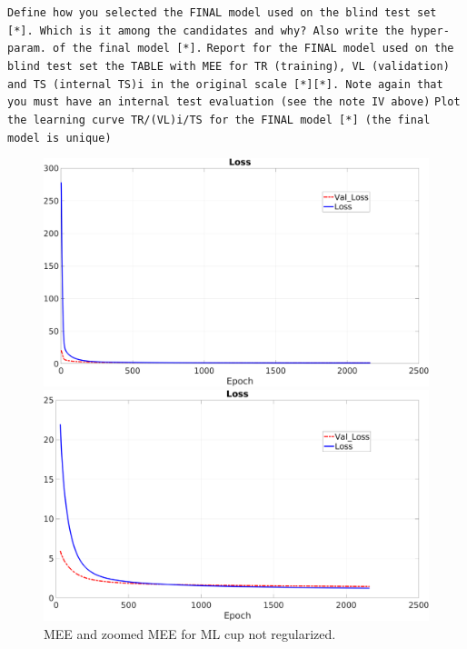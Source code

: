 \texttt{Define how you selected the FINAL model used on the blind test set [*]. Which is it among the candidates and why? Also write the  hyper-param. of the final model [*].}
\texttt{Report for the FINAL model used on the blind test set the TABLE with MEE for TR (training), VL (validation) and TS (internal TS)i  in the original scale [*][*]. Note again  that you must have an internal  test evaluation (see the note IV above)}
\texttt{Plot the learning curve TR/(VL)i/TS for the FINAL model [*] (the final model is unique) }
\begin{figure}[H]
    \centering
    \begin{minipage}[t]{0.5\linewidth}
        \includegraphics[width=\linewidth]{img/Cup_loss_noReg_noZoom.png}
    \end{minipage}%
    \begin{minipage}[t]{0.5\linewidth}
        \includegraphics[width=\linewidth]{img/Cup_loss_noReg_zoom.png}
    \end{minipage}
    \caption{MEE and zoomed MEE for ML cup not regularized.}
\end{figure}

